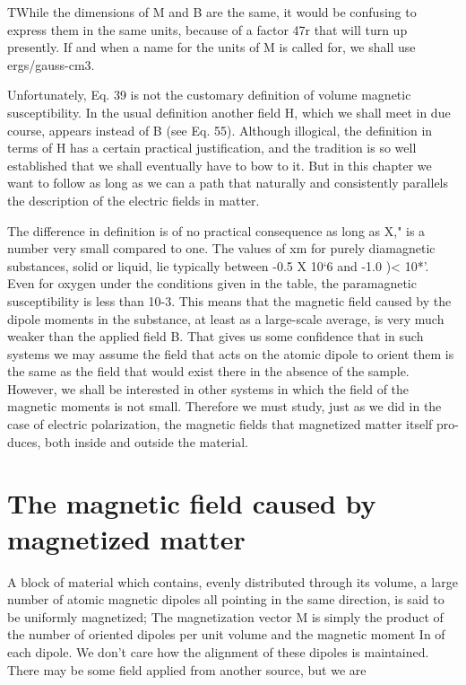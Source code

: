 {{TWhile the dimensions of M and B are the same, it would be confusing to express
them in the same units, because of a factor 47r that will turn up presently. If and
when a name for the units of M is called for, we shall use ergs/gauss-cm3.

Unfortunately, Eq. 39 is not the customary definition of volume
magnetic susceptibility. In the usual definition another field H,
which we shall meet in due course, appears instead of B (see Eq. 55).
Although illogical, the definition in terms of H has a certain practical
justification, and the tradition is so well established that we shall
eventually have to bow to it. But in this chapter we want to follow
as long as we can a path that naturally and consistently parallels the
description of the electric fields in matter.

The difference in definition is of no practical consequence as long
as X," is a number very small compared to one. The values of xm
for purely diamagnetic substances, solid or liquid, lie typically between
-0.5 X 10‘6 and -1.0 )< 10*'. Even for oxygen under the
conditions given in the table, the paramagnetic susceptibility is less
than 10-3. This means that the magnetic field caused by the dipole
moments in the substance, at least as a large-scale average, is very
much weaker than the applied field B. That gives us some confidence
that in such systems we may assume the field that acts on the
atomic dipole to orient them is the same as the field that would exist
there in the absence of the sample. However, we shall be interested
in other systems in which the field of the magnetic moments is not
small. Therefore we must study, just as we did in the case of electric
polarization, the magnetic fields that magnetized matter itself pro-
duces, both inside and outside the material.

\section{The magnetic field caused by magnetized matter}

A block of material which contains, evenly distributed through its
volume, a large number of atomic magnetic dipoles all pointing in
the same direction, is said to be uniformly magnetized; The magnetization
vector M is simply the product of the number of oriented
dipoles per unit volume and the magnetic moment In of each dipole.
We don't care how the alignment of these dipoles is maintained.
There may be some field applied from another source, but we are

}}
